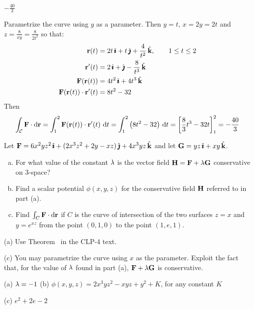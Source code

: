 \begin{answer}
$-\frac{40}{3}$
\end{answer}

\begin{solution} 
Parametrize the curve using $y$ as a parameter. Then $y=t$, $x=2y=2t$ and 
$z=\frac{8}{xy}=\frac{8}{2t^2}$ so that:
\begin{align*}
\mathbf{r}(t)&=2t\,\hat{\pmb{\imath}}+t\,\hat{\pmb{\jmath}}+\frac{4}{t^2}\,\hat{\mathbf{k}},\qquad 1\le t\le 2\\
\mathbf{r}'(t)&=2\,\hat{\pmb{\imath}}+\hat{\pmb{\jmath}}-\frac{8}{t^3}\,\hat{\mathbf{k}}\\
\mathbf{F}(\mathbf{r}(t))&= 4t^2\,\hat{\pmb{\imath}}+4t^3\,\hat{\mathbf{k}}\\
\mathbf{F}(\mathbf{r}(t))\cdot \mathbf{r}'(t)&=8t^2-32
\end{align*}
Then
$$
\int_{\mathcal{C}} \mathbf{F}\cdot \mathrm{d}\mathbf{r}
=\int_1^2 \mathbf{F}(\mathbf{r}(t))\cdot \mathbf{r}'(t)\ \mathrm{d}t
=\int_1^2 \big(8t^2-32\big)\ \mathrm{d}t
= \left[\frac{8}{3}t^3-32t\right]_1^2
=-\frac{40}{3}
$$

\end{solution}


\begin{question}
 Let  $\mathbf{F} = 6x^2yz^2\,\hat{\pmb{\imath}} + (2x^3z^2 + 2y - xz)\,\hat{\pmb{\jmath}} 
+ 4x^3yz\,\hat{\mathbf{k}}$ and let $\mathbf{G} = yz\,\hat{\pmb{\imath}} + xy\,\hat{\mathbf{k}}$. 
\begin{enumerate}[(a)]
\item 
For what value of the constant $\lambda$ is the vector field 
$\mathbf{H} = \mathbf{F} +  \lambda\mathbf{G}$ conservative on 3-space? 
\item
Find a scalar potential $\phi(x,y,z)$ for the conservative field $\mathbf{H}$ referred to in part (a). 
\item 
Find   $\int_C\mathbf{F}\cdot \mathrm{d}\mathbf{r}$ if $C$ is the curve of intersection of the two surfaces $z = x$ and $y = e^{xz}$ from the point $(0, 1, 0)$ to 
the point $(1, e, 1)$.
\end{enumerate} 
\end{question}

\begin{hint} 
(a) Use Theorem~ in the CLP-4 text.

(c) You may parametrize the curve using $x$ as the parameter.
Exploit the fact that, for the value of $\lambda$ found in part (a), $\mathbf{F}+\lambda \mathbf{G}$ is conservative.
\end{hint}

\begin{answer} 
(a) $\lambda=-1$\qquad
(b) $\phi(x,y,z)=2x^3yz^2-xyz+y^2+K$, for any constant $K$

(c) $e^2+2e-2$
\end{answer}

